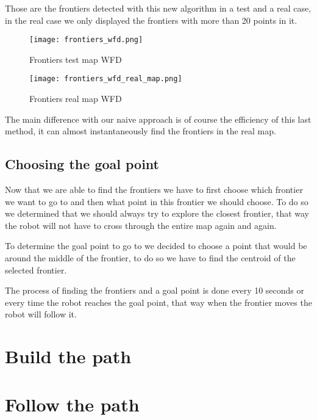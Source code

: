 Those are the frontiers detected with this new algorithm in a test and a real case, in the real case we only displayed the frontiers with more than 20 points in it.

\FloatBarrier
\begin{figure}
    \centering\texttt{[image: frontiers\_wfd.png]}
    \label{fig:frontiers_wfd}
    \caption{Frontiers test map WFD}
\end{figure}
\FloatBarrier
\begin{figure}
    \centering\texttt{[image: frontiers\_wfd\_real\_map.png]}
    \label{fig:frontiers_wfd_real_map}
    \caption{Frontiers real map WFD}
\end{figure}
\FloatBarrier

The main difference with our naive approach is of course the efficiency of this last method, it can almost instantaneously find the frontiers in the real map.

\subsection{Choosing the goal point}

Now that we are able to find the frontiers we have to first choose which frontier we want to go to and then what point in this frontier we should choose.
To do so we determined that we should always try to explore the closest frontier, that way the robot will not have to cross through the entire map again and again.

To determine the goal point to go to we decided to choose a point that would be around the middle of the frontier, to do so we have to find the centroid of the selected frontier.

The process of finding the frontiers and a goal point is done every 10 seconds or every time the robot reaches the goal point, that way when the frontier moves the robot will follow it.

\section{Build the path}

\section{Follow the path}

